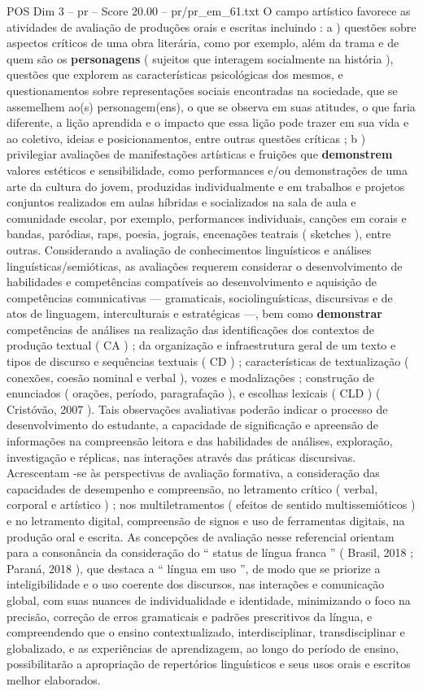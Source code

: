 \begin{textsample}{POS Dim 3 – pr – Score 20.00 – pr/pr\_em\_61.txt}
O campo artístico favorece as atividades de avaliação de produções orais e escritas incluindo : a ) questões sobre aspectos críticos de uma obra literária, como por exemplo, além da trama e de quem são os \textbf{personagens} ( sujeitos que interagem socialmente na história ), questões que explorem as características psicológicas dos mesmos, e questionamentos sobre representações sociais encontradas na sociedade, que se assemelhem ao(s) personagem(ens), o que se observa em suas atitudes, o que faria diferente, a lição aprendida e o impacto que essa lição pode trazer em sua vida e ao coletivo, ideias e posicionamentos, entre outras questões críticas ; b ) privilegiar avaliações de manifestações artísticas e fruições que \textbf{demonstrem} valores estéticos e sensibilidade, como performances e/ou demonstrações de uma arte da cultura do jovem, produzidas individualmente e em trabalhos e projetos conjuntos realizados em aulas híbridas e socializados na sala de aula e comunidade escolar, por exemplo, performances individuais, canções em corais e bandas, paródias, raps, poesia, jograis, encenações teatrais ( sketches ), entre outras.
Considerando a avaliação de conhecimentos linguísticos e análises linguísticas/semióticas, as avaliações requerem considerar o desenvolvimento de habilidades e competências compatíveis ao desenvolvimento e aquisição de competências comunicativas — gramaticais, sociolinguísticas, discursivas e de atos de linguagem, interculturais e estratégicas —, bem como \textbf{demonstrar} competências de análises na realização das identificações dos contextos de produção textual ( CA ) ; da organização e infraestrutura geral de um texto e tipos de discurso e sequências textuais ( CD ) ; características de textualização ( conexões, coesão nominal e verbal ), vozes e modalizações ; construção de enunciados ( orações, período, paragrafação ), e escolhas lexicais ( CLD ) ( Cristóvão, 2007 ).
Tais observações avaliativas poderão indicar o processo de desenvolvimento do estudante, a capacidade de significação e apreensão de informações na compreensão leitora e das habilidades de análises, exploração, investigação e réplicas, nas interações através das práticas discursivas.
Acrescentam -se às perspectivas de avaliação formativa, a consideração das capacidades de desempenho e compreensão, no letramento crítico ( verbal, corporal e artístico ) ; nos multiletramentos ( efeitos de sentido multissemióticos ) e no letramento digital, compreensão de signos e uso de ferramentas digitais, na produção oral e escrita.
As concepções de avaliação nesse referencial orientam para a consonância da consideração do “ status de língua franca ” ( Brasil, 2018 ; Paraná, 2018 ), que destaca a “ língua em uso ”, de modo que se priorize a inteligibilidade e o uso coerente dos discursos, nas interações e comunicação global, com suas nuances de individualidade e identidade, minimizando o foco na precisão, correção de erros gramaticais e padrões prescritivos da língua, e compreendendo que o ensino contextualizado, interdisciplinar, transdisciplinar e globalizado, e as experiências de aprendizagem, ao longo do período de ensino, possibilitarão a apropriação de repertórios linguísticos e seus usos orais e escritos melhor elaborados.

\end{textsample}

